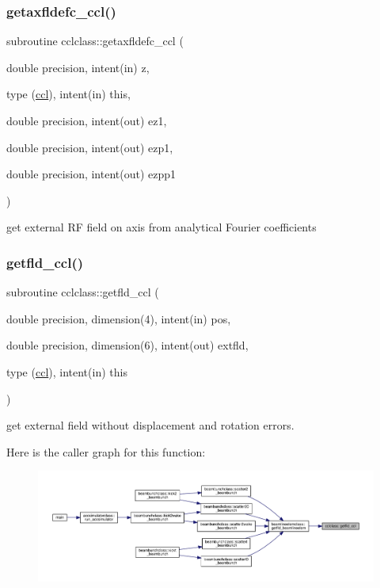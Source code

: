 \subsubsection{\texorpdfstring{getaxfldefc\_ccl()}{getaxfldefc\_ccl()}}
{\footnotesize\ttfamily subroutine cclclass\+::getaxfldefc\+\_\+ccl (\begin{DoxyParamCaption}\item[{double precision, intent(in)}]{z,  }\item[{type (\mbox{\hyperlink{namespacecclclass_structcclclass_1_1ccl}{ccl}}), intent(in)}]{this,  }\item[{double precision, intent(out)}]{ez1,  }\item[{double precision, intent(out)}]{ezp1,  }\item[{double precision, intent(out)}]{ezpp1 }\end{DoxyParamCaption})}



get external RF field on axis from analytical Fourier coefficients 

\mbox{\label{namespacecclclass_a6c8d8825e6d50c30ba91c90892619a5b}} 
\subsubsection{\texorpdfstring{getfld\_ccl()}{getfld\_ccl()}}
{\footnotesize\ttfamily subroutine cclclass\+::getfld\+\_\+ccl (\begin{DoxyParamCaption}\item[{double precision, dimension(4), intent(in)}]{pos,  }\item[{double precision, dimension(6), intent(out)}]{extfld,  }\item[{type (\mbox{\hyperlink{namespacecclclass_structcclclass_1_1ccl}{ccl}}), intent(in)}]{this }\end{DoxyParamCaption})}



get external field without displacement and rotation errors. 

Here is the caller graph for this function\+:\nopagebreak
\begin{figure}[H]
\begin{center}
\leavevmode
\includegraphics[width=350pt]{namespacecclclass_a6c8d8825e6d50c30ba91c90892619a5b_icgraph}
\end{center}
\end{figure}
\mbox{\label{namespacecclclass_a4d8386891ff89c7352f001b01d5f84b5}} 
